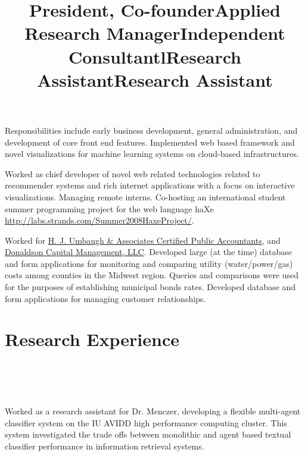 \documentclass[overlapped,line,letterpaper]{res}
\begin{document}
\begin{resume}
\title{President, Co-founder}
\begin{position}
Responsibilities include early business development, general administration, and development of core front end features. Implemented web based framework and novel visualizations for machine learning systems on cloud-based infrastructures.
\end{position}


\title{Applied Research Manager}
\begin{position}
Worked as chief developer of novel web related technologies related to recommender systems and rich internet applications with a focus on interactive visualizations.  Managing remote interns.  Co-hosting an international student summer programming project for the web language haXe \url{http://labs.strands.com/Summer2008HaxeProject/}.
\end{position}

\title{Independent Consultant}
\begin{position}
Worked for \href{http://www.hju.com}{H. J. Umbaugh \& Associates Certified Public Accountants}, and \href{http://www.dcmol.com}{Donaldson Capital Management, LLC}.
Developed large (at the time) database and form applications for monitoring and comparing utility (water/power/gas) costs among counties in the Midwest region.  Queries and comparisons were used for the purposes of establishing municipal bonds rates.  
Developed database and form applications for managing customer relationships. 

\end{position}

\section{\bf Research Experience}

\begin{format}
\title{l}\\
\\
\body\\
\end{format}

\title{Research Assistant}
\title{Research Assistant}
\begin{position}
Worked as a research assistant for Dr. Menczer, developing a flexible multi-agent classifier system on the IU AVIDD high performance computing cluster.  This system investigated the trade offs between monolithic and agent based textual classifier performance in information retrieval systems.  
\end{position}


\end{resume}
\end{document}
